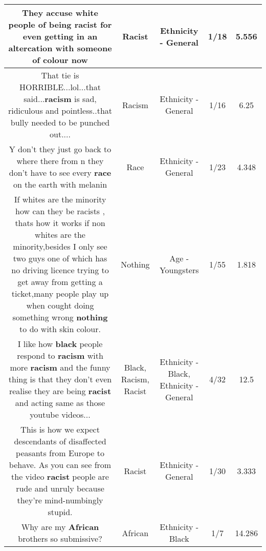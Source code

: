 \documentclass[11pt]{article}
\newlength\mylength
\begin{document}
\begin{center}
\begin{longtable}{|C{.65\mylength}|C{.30\mylength}|C{.12\mylength}|C{.12\mylength}|C{.12\mylength}|}
  \small They accuse white people of being \textbf{racist} for even getting in an altercation with someone of colour now\normalsize   & Racist & Ethnicity - General & 1/18 & 5.556 \\  \hline
  \small That tie is HORRIBLE...lol...that said...\textbf{racism} is sad, ridiculous and pointless..that bully needed to be punched out....\normalsize   & Racism & Ethnicity - General & 1/16 & 6.25 \\  \hline
  \small Y don't they just go back to where there from n they don't have to see every \textbf{race} on the earth with melanin\normalsize   & Race & Ethnicity - General & 1/23 & 4.348 \\  \hline
  \small If whites are the minority how can they be racists , thats how it works if non whites are the minority,besides I only see two guys one of which has no driving licence trying to get away from getting a ticket,many people play up when cought doing something wrong \textbf{nothing} to do with skin colour.\normalsize   & Nothing & Age - Youngsters & 1/55 & 1.818 \\  \hline
  \small I like how \textbf{black} people respond to \textbf{racism} with more \textbf{racism} and the funny thing is that they don't even realise they are being \textbf{racist} and acting same as those youtube videos...\normalsize   & Black, Racism, Racist & Ethnicity - Black, Ethnicity - General & 4/32 & 12.5 \\  \hline
  \small This is how we expect descendants of disaffected peasants from Europe to behave. As you can see from the video \textbf{racist} people are rude and unruly because they're mind-numbingly stupid.\normalsize   & Racist & Ethnicity - General & 1/30 & 3.333 \\  \hline
  \small Why are my \textbf{African} brothers so submissive?\normalsize   & African & Ethnicity - Black & 1/7 & 14.286 \\  \hline

\end{longtable}
\end{center}
\end{document}
